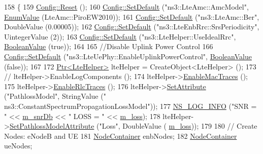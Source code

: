\begin{DoxyCode}
158 \{
159   \hyperlink{group__config_ga2c1b65724f42f8c72276d7e7ad6df6db}{Config::Reset} ();
160   \hyperlink{group__config_ga2e7882df849d8ba4aaad31c934c40c06}{Config::SetDefault} (\textcolor{stringliteral}{"ns3::LteAmc::AmcModel"}, \hyperlink{classns3_1_1EnumValue}{EnumValue} (LteAmc::PiroEW2010));
161   \hyperlink{group__config_ga2e7882df849d8ba4aaad31c934c40c06}{Config::SetDefault} (\textcolor{stringliteral}{"ns3::LteAmc::Ber"}, DoubleValue (0.00005));
162   \hyperlink{group__config_ga2e7882df849d8ba4aaad31c934c40c06}{Config::SetDefault} (\textcolor{stringliteral}{"ns3::LteEnbRrc::SrsPeriodicity"}, UintegerValue (2));
163   \hyperlink{group__config_ga2e7882df849d8ba4aaad31c934c40c06}{Config::SetDefault} (\textcolor{stringliteral}{"ns3::LteHelper::UseIdealRrc"}, 
      \hyperlink{classns3_1_1BooleanValue}{BooleanValue} (\textcolor{keyword}{true}));
164 
165   \textcolor{comment}{//Disable Uplink Power Control}
166   \hyperlink{group__config_ga2e7882df849d8ba4aaad31c934c40c06}{Config::SetDefault} (\textcolor{stringliteral}{"ns3::LteUePhy::EnableUplinkPowerControl"}, 
      \hyperlink{classns3_1_1BooleanValue}{BooleanValue} (\textcolor{keyword}{false}));
167 
172   \hyperlink{classns3_1_1Ptr}{Ptr<LteHelper>} lteHelper = CreateObject<LteHelper> ();
173 \textcolor{comment}{//   lteHelper->EnableLogComponents ();}
174   lteHelper->\hyperlink{classns3_1_1LteHelper_affa3a12841520407d3662417fe41863d}{EnableMacTraces} ();
175   lteHelper->\hyperlink{classns3_1_1LteHelper_abadfdd04d30b261e9b6f0846b4784928}{EnableRlcTraces} ();
176   lteHelper->\hyperlink{classns3_1_1ObjectBase_ac60245d3ea4123bbc9b1d391f1f6592f}{SetAttribute} (\textcolor{stringliteral}{"PathlossModel"}, StringValue (\textcolor{stringliteral}{"
      ns3::ConstantSpectrumPropagationLossModel"}));
177   \hyperlink{group__logging_gafbd73ee2cf9f26b319f49086d8e860fb}{NS\_LOG\_INFO} (\textcolor{stringliteral}{"SNR = "} << \hyperlink{classLteLinkAdaptationTestCase_ae48411edbef532314f5031f8a5371cca}{m\_snrDb} << \textcolor{stringliteral}{"  LOSS = "} << \hyperlink{classLteLinkAdaptationTestCase_a6506f5bd0db4467756819735634a3237}{m\_loss});
178   lteHelper->\hyperlink{classns3_1_1LteHelper_aa96ebbd6845ca61c2b5e08e84481a348}{SetPathlossModelAttribute} (\textcolor{stringliteral}{"Loss"}, DoubleValue (
      \hyperlink{classLteLinkAdaptationTestCase_a6506f5bd0db4467756819735634a3237}{m\_loss}));
179 
180   \textcolor{comment}{// Create Nodes: eNodeB and UE}
181   \hyperlink{classns3_1_1NodeContainer}{NodeContainer} enbNodes;
182   \hyperlink{classns3_1_1NodeContainer}{NodeContainer} ueNodes;

\end{DoxyCode}
